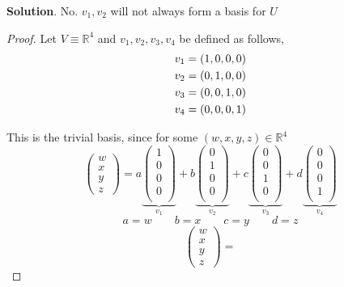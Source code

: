 \documentclass[12pt]{article}
\newcommand{\R}{\mathbb{R}}
\newcommand{\x}{x \in \mathbb{R}}
\begin{document}
\begin{enumerate}
\begin{mybox}
    \textbf{Solution}. No. $v_1, v_2$ will not always form a basis for $U$
    \begin{proof}
        Let $V \equiv \R^4$ and $v_1, v_2, v_3, v_4$ be defined as follows,
        \begin{align}
            v_1 &= (1, 0, 0, 0) \notag\\
            v_2 &= (0, 1, 0, 0) \notag\\
            v_3 &= (0, 0, 1, 0) \notag\\
            v_4 &= (0, 0, 0, 1) \notag
        \end{align}
        
        This is the trivial basis, since for some $(w, x, y, z) \in \R^4$
        $$\begin{pmatrix} w \\x \\y\\z \end{pmatrix} = 
    a \underbrace{
        \begin{pmatrix}
            1 \\ 0 \\ 0 \\ 0 \\
        \end{pmatrix}
    }_{v_1}
    + b
    \underbrace{
        \begin{pmatrix}
            0 \\ 1 \\ 0 \\ 0 \\
        \end{pmatrix}
    }_{v_2}
    + c
    \underbrace{
        \begin{pmatrix}
            0 \\ 0 \\ 1 \\ 0 \\
        \end{pmatrix}
    }_{v_3} 
    + d
    \underbrace{
        \begin{pmatrix}
            0 \\ 0 \\ 0 \\ 1 \\
        \end{pmatrix}
    }_{v_4} 
    $$
    $$a = w \qquad b = x \qquad c = y \qquad d = z$$
    $$\begin{pmatrix} w \\x \\y\\z \end{pmatrix} = 
$$
\end{proof}
\end{mybox}
\end{enumerate}
\end{document}
